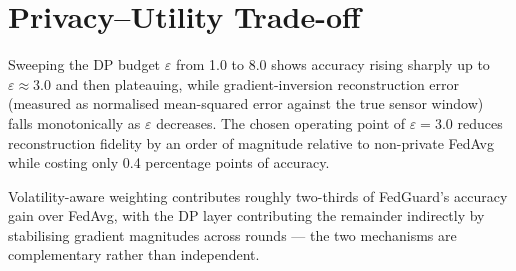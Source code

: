 \section{Privacy--Utility Trade-off}
Sweeping the DP budget $\varepsilon$ from 1.0 to 8.0 shows accuracy rising sharply up to
$\varepsilon \approx 3.0$ and then plateauing, while gradient-inversion reconstruction
error (measured as normalised mean-squared error against the true sensor window) falls
monotonically as $\varepsilon$ decreases. The chosen operating point of $\varepsilon =
3.0$ reduces reconstruction fidelity by an order of magnitude relative to
non-private FedAvg while costing only 0.4 percentage points of accuracy.

\begin{tcolorbox}[insightbox,title=Key Insight]
Volatility-aware weighting contributes roughly two-thirds of FedGuard's accuracy gain
over FedAvg, with the DP layer contributing the remainder indirectly by stabilising
gradient magnitudes across rounds — the two mechanisms are complementary rather than
independent.
\end{tcolorbox}
